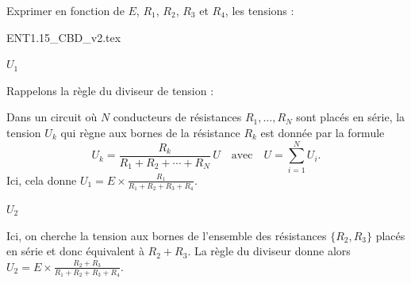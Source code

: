 Exprimer en fonction de $E$, $R_1$, $R_2$, $R_3$ et $R_4$, les tensions :

\medskip

                                \initialisationPartieDroite %
\begin{center}
{ENT1.15_CBD_v2.tex}
\end{center}
                               \finalisationDuPartageDePage %
\medskip
\debutEntrainement

\begin{enonce}
$U_1$
\end{enonce}


\begin{corrige}
Rappelons la règle du diviseur de tension : 

Dans un circuit où $N$ conducteurs de résistances $R_1, \ldots, R_N$ sont placés en série, la tension $U_k$ qui règne aux bornes de la résistance $R_k$ est donnée par la formule 
$$
U_k=\frac{R_k}{R_1 + R_2 + \cdots + R_N}\, U
\quad\text{avec}\quad
U=\sum_{i=1}^N U_i.
$$
Ici, cela donne $U_1=E\times \frac{R_1}{R_1+R_2+R_3+R_4}$.
\end{corrige}

\begin{enonce}
$U_2$
\end{enonce}


\begin{corrige}
Ici, on cherche la tension aux bornes de l'ensemble des résistances $\{R_2,R_3\}$ placés en série et donc équivalent à $R_2+R_3$. La règle du diviseur donne alors $U_2=E\times\frac{R_2+R_3}{R_1+R_2+R_3+R_4}$.

\end{corrige}

